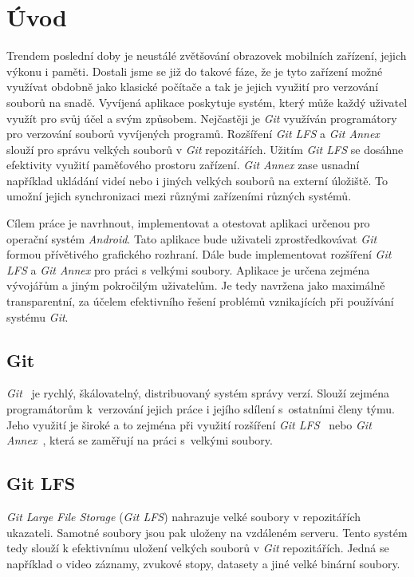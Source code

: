 \chapter{Úvod}
Trendem poslední doby je neustálé zvětšování obrazovek mobilních zařízení, jejich výkonu i paměti. Dostali jsme se již do takové fáze, že je tyto zařízení možné využívat obdobně jako klasické počítače a tak je jejich využití pro verzování souborů na snadě.
Vyvíjená aplikace poskytuje systém, který může každý uživatel využít pro svůj účel a svým způsobem. Nejčastěji je \emph{Git} využíván programátory pro verzování souborů vyvíjených programů. Rozšíření \emph{Git LFS} a \emph{Git Annex} slouží pro správu velkých souborů v \emph{Git} repozitářích. Užitím \emph{Git LFS} se dosáhne efektivity využití paměťového prostoru zařízení. \emph{Git Annex} zase usnadní například ukládání videí nebo i jiných velkých souborů na externí úložiště. To umožní jejich synchronizaci mezi různými zařízeními různých systémů.

Cílem práce je navrhnout, implementovat a otestovat aplikaci určenou pro operační systém \emph{Android}. Tato aplikace bude uživateli zprostředkovávat \emph{Git} formou přívětivého grafického rozhraní. Dále bude implementovat rozšíření \emph{Git LFS} a \emph{Git Annex} pro práci s velkými soubory. Aplikace je určena zejména vývojářům a jiným pokročilým uživatelům. Je tedy navržena jako maximálně transparentní, za účelem efektivního řešení problémů vznikajících při používání systému \emph{Git}.
\newpage
\section{Git}
\emph{Git}~\cite{git} je rychlý, škálovatelný, distribuovaný systém správy verzí. Slouží zejména programátorům k verzování jejich práce i jejího sdílení s ostatními členy týmu. Jeho využití je široké a to zejména při využití rozšíření \emph{Git LFS}~\cite{git-lfs} nebo \emph{Git Annex}~\cite{git-annex}, která se zaměřují na práci s velkými soubory.

\section{Git LFS}
\emph{Git Large File Storage} (\emph{Git LFS}) nahrazuje velké soubory v repozitářích ukazateli. Samotné soubory jsou pak uloženy na vzdáleném serveru. Tento systém tedy slouží k efektivnímu uložení velkých souborů v \emph{Git} repozitářích. Jedná se například o video záznamy, zvukové stopy, datasety a jiné velké binární soubory.

